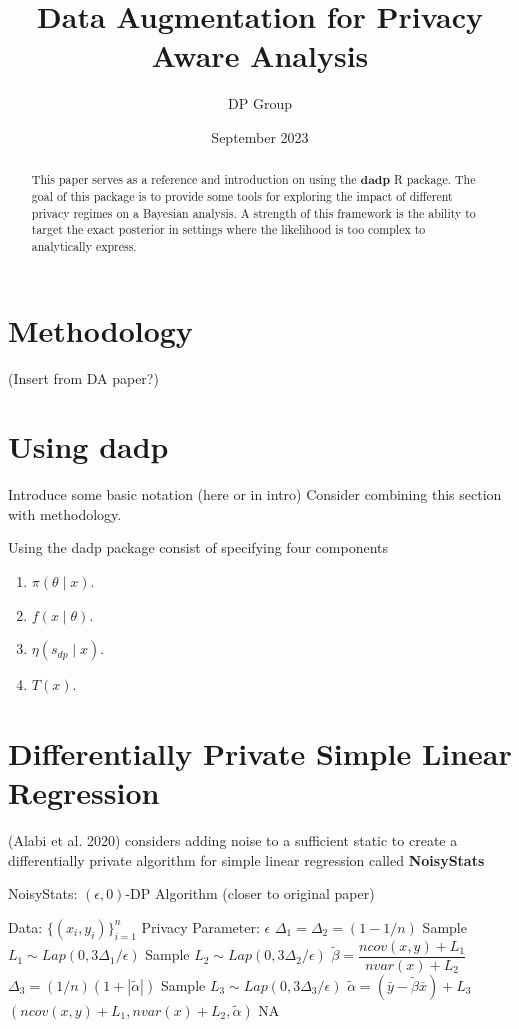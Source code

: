 \documentclass{article}\usepackage[]{graphicx}\usepackage[]{xcolor}
\title{Data Augmentation for Privacy Aware Analysis}
\author{DP Group}
\date{September 2023}
\theoremstyle{definition}
\newcommand{\dpn}{\textbf{dadp}}
\begin{document}
\maketitle

\begin{abstract}
    This paper serves as a reference and introduction on using the $\dpn$ R
    package. The goal of this package is to provide some tools for exploring the
    impact of different privacy regimes on a Bayesian analysis. A strength of
    this framework is the ability to target the exact posterior in settings
    where the likelihood is too complex to analytically express.
\end{abstract}

\section*{Methodology}
(Insert from DA paper?)



\section*{Using dadp}
Introduce some basic notation (here or in intro)
Consider combining this section with methodology.



Using the dadp package consist of specifying four components
\begin{enumerate}
  \item $\pi(\theta \mid x)$.
  \item $f(x \mid \theta)$.
  \item $\eta(s_{dp} \mid x)$.
  \item $T(x)$.
\end{enumerate}



\section*{Differentially Private Simple Linear Regression}

(Alabi et al. 2020)\cite{alabi2020} considers adding noise to a sufficient static
to create a differentially private algorithm for simple linear regression
called \textbf{NoisyStats}

\begin{algorithm}
\begin{algorithmic}[1]
\caption{NoisyStats: $(\epsilon, 0)$-DP Algorithm (closer to original paper)}
\State Data: $\{(x_i,y_i)\}_{i=1}^{n}$
\State Privacy Parameter: $\epsilon$
\State $\Delta_1 = \Delta_2 = (1 - 1/n)$ 
\State Sample $L_1 \sim Lap(0, 3\Delta_1/\epsilon)$
\State Sample $L_2 \sim Lap(0, 3\Delta_2/\epsilon)$
\State $\tilde{\beta} = \dfrac{ncov(x,y) + L_1}{nvar(x) + L_2}$\\
\State $\Delta_3 = (1/n)(1 + |\tilde{\alpha}|)$
\State Sample $L_3 \sim Lap(0, 3\Delta_3/\epsilon)$
\State $\tilde{\alpha} = (\bar{y} - \tilde{\beta}\bar{x}) + L_3$
\State \Return $(ncov(x,y) + L_1, nvar(x) + L_2, \tilde{\alpha})$
\EndIf
\State \Return NA
\end{algorithmic}
\end{algorithm}
\end{document}
